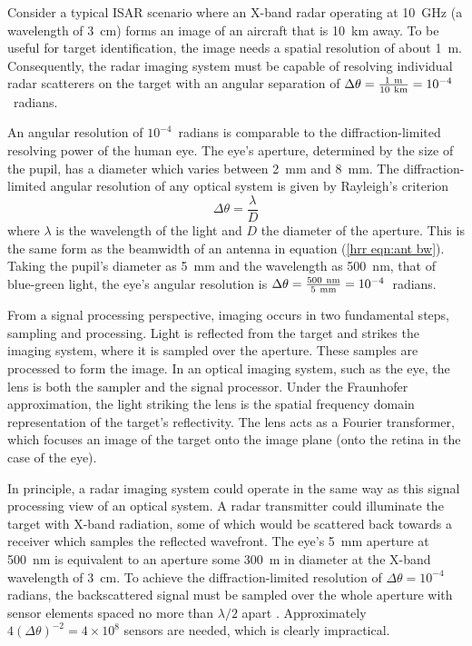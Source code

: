 Consider a typical ISAR scenario where an X-band radar operating at 10~GHz
(a wavelength of 3~cm) forms an image of an aircraft that is 10~km away. To
be useful for target identification, the image needs a spatial resolution of
about 1~m.  Consequently, the radar imaging system must be capable of
resolving individual radar scatterers on the target with an angular
separation of $\Delta\theta=\frac{1\ \rm m}{10\ \rm km}=10^{-4}$~radians.

An angular resolution of $10^{-4}$~radians is comparable to the 
diffraction-limited resolving power of the human eye.  The eye's aperture, 
determined by the size of the pupil, has a diameter which varies between 2~mm 
and 8~mm.  The diffraction-limited angular resolution of any optical system 
is given by Rayleigh's criterion \cite{Goo68}
\begin{equation}
\Delta\theta=\frac{\lambda}{D}
\end{equation}
where $\lambda$ is the wavelength of the light and $D$ the diameter of the 
aperture.  This is the same form as the beamwidth of an antenna in equation 
(\ref{hrr eqn:ant bw}).  Taking the pupil's diameter as 5~mm and the 
wavelength as 500~nm, that of blue-green light, the eye's angular resolution 
is $\Delta\theta=\frac{500\ \rm nm}{5\ \rm mm}= 10^{-4}$~radians.

From a signal processing perspective, imaging occurs in two fundamental
steps, sampling and processing.  Light is reflected from the target and 
strikes the imaging system, where it is sampled over the aperture.  These 
samples are processed to form the image.  In an optical imaging system, such 
as the eye, the lens is both the sampler and the signal
processor.  Under the Fraunhofer approximation, the light striking the lens
is the spatial frequency domain representation of the target's
reflectivity.  The lens acts as a Fourier transformer, which focuses an 
image of the target onto the image plane (onto the retina in the case of
the eye).

In principle, a radar imaging system could operate in the same way as this
signal processing view of an optical system.  A radar transmitter could
illuminate the target with X-band radiation, some of which would be
scattered back towards a receiver which samples the reflected wavefront. The
eye's 5~mm aperture at 500~nm is equivalent to an aperture some 300~m in
diameter at the X-band wavelength of 3~cm.  To achieve the
diffraction-limited resolution of $\Delta\theta=10^{-4}$ radians, the
backscattered signal must be sampled over the whole aperture with sensor
elements spaced no more than $\lambda/2$ apart \cite{Ste83b}.  Approximately
$4(\Delta\theta)^{-2}=4\times 10^8$ sensors are needed, which is clearly 
impractical.

